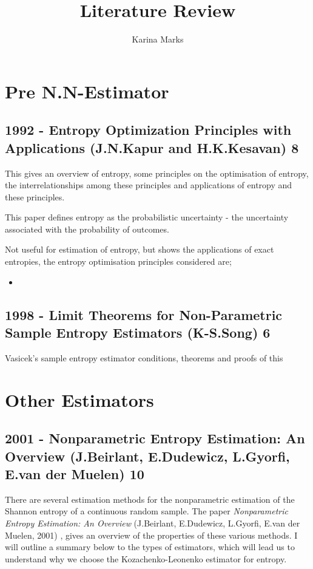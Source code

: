 \documentclass{article}
\title{Literature Review}
\author{Karina Marks}
\begin{document}
\maketitle
\section{Pre N.N-Estimator}
\subsection{1992 - Entropy Optimization Principles with Applications (J.N.Kapur and H.K.Kesavan) 8}

This gives an overview of entropy, some principles on the optimisation of entropy, the interrelationships among these principles and applications of entropy and these principles.

This paper defines entropy as the probabilistic uncertainty - the uncertainty associated with the probability of outcomes.

Not useful for estimation of entropy, but shows the applications of exact entropies, the entropy optimisation principles considered are;
\begin{itemize}
\item 
\end{itemize}

\subsection{1998 - Limit Theorems for Non-Parametric Sample Entropy Estimators (K-S.Song) 6}

Vasicek's sample entropy estimator
conditions, theorems and proofs of this


\section{Other Estimators}

\subsection{2001 - Nonparametric Entropy Estimation: An Overview (J.Beirlant, E.Dudewicz, L.Gyorfi, E.van der Muelen) 10}

There are several estimation methods for the nonparametric estimation of the Shannon entropy of a continuous random sample. The paper \textit{Nonparametric Entropy Estimation: An Overview} (J.Beirlant, E.Dudewicz, L.Gyorfi, E.van der Muelen, 2001) \cite{paper10}, gives an overview of the properties of these various methods. I will outline a summary below to the types of estimators, which will lead us to understand why we choose the Kozachenko-Leonenko estimator for entropy. 
\end{document}
